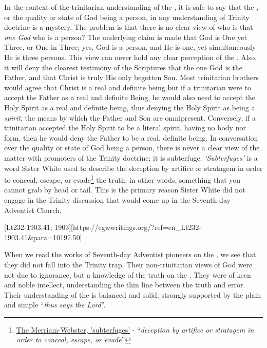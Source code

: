 In the context of the trinitarian understanding of the , it is safe to say that the , or the quality or state of God being a person, in any understanding of Trinity doctrine is a mystery. The problem is that there is no clear view of who is that \textit{one God} who is a person? The underlying claim is made that God is One yet Three, or One in Three; yes, God is a person, and He is one, yet simultaneously He is three persons. This view can never hold any clear perception of the . Also, it will deny the clearest testimony of the Scriptures that the one God is the Father, and that Christ is truly His only begotten Son. Most trinitarian brothers would agree that Christ is a real and definite being but if a trinitarian were to accept the Father as a real and definite Being, he would also need to accept the Holy Spirit as a real and definite being, thus denying the Holy Spirit as being a \textit{spirit}, the means by which the Father and Son are omnipresent. Conversely, if a trinitarian accepted the Holy Spirit to be a literal spirit, having no body nor form, then he would deny the Father to be a real, definite being. In conversation over the quality or state of God being a person, there is never a clear view of the matter with promoters of the Trinity doctrine; it is subterfuge. \textit{‘Subterfuges’} is a word Sister White used to describe the deception by artifice or stratagem in order to conceal, escape, or evade\footnote{\href{https://www.merriam-webster.com/dictionary/subterfuges}{The Merriam-Webster, 'subterfuges'} - “\textit{deception by artifice or stratagem in order to conceal, escape, or evade}”} the truth; in other words, something that you cannot grab by head or tail. This is the primary reason Sister White did not engage in the Trinity discussion that would come up in the Seventh-day Adventist Church.

[Lt232-1903.41; 1903][https://egwwritings.org/?ref=en\_Lt232-1903.41&para=10197.50]

When we read the works of Seventh-day Adventist pioneers on the , we see that they did not fall into the Trinity trap. Their non-trinitarian views of God were not due to ignorance, but a knowledge of the truth on the . They were of keen and noble intellect, understanding the thin line between the truth and error. Their understanding of the  is balanced and solid, strongly supported by the plain and simple “\textit{thus says the Lord}”.

